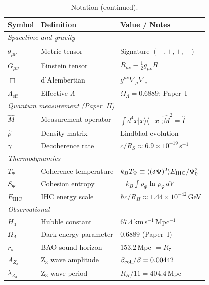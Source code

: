 \begin{table}[htbp]
\centering
\caption{Notation (continued).}
\label{tab:notation2}
\setlength{\tabcolsep}{5pt}
\renewcommand{\arraystretch}{1.15}
\begin{tabular}{@{}l l l@{}}
\toprule
\textbf{Symbol} & \textbf{Definition} & \textbf{Value / Notes} \\
\midrule
\multicolumn{3}{l}{\textit{Spacetime and gravity}} \\
$g_{\mu\nu}$ & Metric tensor & Signature $(-,+,+,+)$ \\
$G_{\mu\nu}$ & Einstein tensor & $R_{\mu\nu}-\tfrac{1}{2}g_{\mu\nu}R$ \\
$\Box$    & d'Alembertian & $g^{\mu\nu}\nabla_\mu\nabla_\nu$ \\
$\Lambda_{\mathrm{eff}}$ & Effective $\Lambda$ & $\Omega_\Lambda=0.6889$; Paper~I \\
\midrule
\multicolumn{3}{l}{\textit{Quantum measurement (Paper~II)}} \\
$\hat{M}$ & Measurement operator & $\int d^4x|x\rangle\langle{-x}|$;\;$\hat{M}^2=\hat{I}$ \\
$\hat{\rho}$ & Density matrix & Lindblad evolution \\
$\gamma$  & Decoherence rate & $c/R_S\approx6.9\!\times\!10^{-19}$\,s$^{-1}$ \\
\midrule
\multicolumn{3}{l}{\textit{Thermodynamics}} \\
$T_\Psi$  & Coherence temperature & $k_BT_\Psi\equiv\langle(\delta\Psi)^2\rangle E_{\rm IHC}/\Psi_0^2$ \\
$S_\Psi$  & Cohesion entropy & $-k_B\!\int\rho_\Psi\ln\rho_\Psi\,dV$ \\
$E_{\mathrm{IHC}}$ & IHC energy scale & $\hbar c/R_H\approx1.44\!\times\!10^{-42}$\,GeV \\
\midrule
\multicolumn{3}{l}{\textit{Observational}} \\
$H_0$     & Hubble constant & $67.4$\,km\,s$^{-1}$\,Mpc$^{-1}$ \\
$\Omega_\Lambda$ & Dark energy parameter & $0.6889$ (Paper~I) \\
$r_s$     & BAO sound horizon & $153.2$\,Mpc $=R_7$ \\
$A_{Z_3}$ & Z$_3$ wave amplitude & $\beta_{\rm coh}/\beta=0.00442$ \\
$\lambda_{Z_3}$ & Z$_3$ wave period & $R_H/11=404.4$\,Mpc \\
\bottomrule
\end{tabular}
\end{table}

